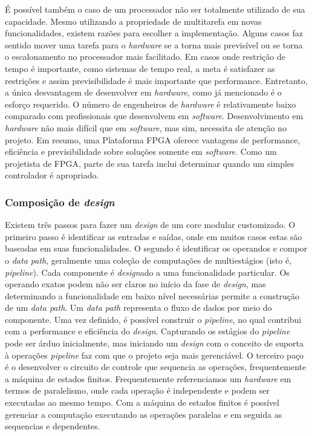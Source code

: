 É possível também o caso de um processador não ser totalmente utilizado de sua capacidade. Mesmo utilizando a propriedade de multitarefa em novas funcionalidades, existem razões para escolher a implementação. Alguns casos faz sentido mover uma tarefa para o \textit{hardware} se a torna mais previsível ou se torna o escalonamento no processador mais facilitado. Em casos onde restrição de tempo é importante, como sistemas de tempo real, a meta é satisfazer as restrições e assim previsibilidade é mais importante que performance. Entretanto, a única desvantagem de desenvolver em \textit{hardware}, como já mencionado é o esforço requerido. O número de engenheiros de \textit{hardware} é relativamente baixo comparado com profissionais que desenvolvem em \textit{software}. Desenvolvimento em \textit{hardware} não mais difícil que em \textit{software}, mas sim, necessita de atenção no projeto. Em resumo, uma Plataforma FPGA oferece vantagens de performance, eficiência e previsibilidade sobre soluções somente em \textit{software}. Como um projetista de FPGA, parte de sua tarefa inclui determinar quando um simples controlador é apropriado.



\subsubsection{Composição de \textit{design}}



Existem três passos para fazer um \textit{design} de um core modular customizado. O primeiro passo é identificar as entradas e saídas, onde em muitos casos estas são baseadas em suas funcionalidades. O segundo é identificar os operandos e compor o \textit{data path}, geralmente uma coleção de computações de multiestágios (isto é, \textit{pipeline}). Cada componente é \textit{design}ado a uma funcionalidade particular. Os operando exatos podem não ser claros no início da fase de \textit{design}, mas determinando a funcionalidade em baixo nível necessárias permite a construção de um \textit{data path}. Um \textit{data path} representa o fluxo de dados por meio do componente. Uma vez definido, é possível construir o \textit{pipeline}, no qual contribui com a performance e eficiência do \textit{design}. Capturando os estágios do \textit{pipeline} pode ser árduo inicialmente, mas iniciando um \textit{design} com o conceito de suporta à operações \textit{pipeline} faz com que o projeto seja mais gerenciável. O terceiro paço é o desenvolver o circuito de controle que sequencia as operações, frequentemente a máquina de estados finitos. Frequentemente referenciamos um \textit{hardware} em termos de paralelismo, onde cada operação é independente e podem ser executadas ao mesmo tempo. Com a máquina de estados finitos é possível gerenciar a computação executando as operações paralelas e em seguida as sequencias e dependentes.

